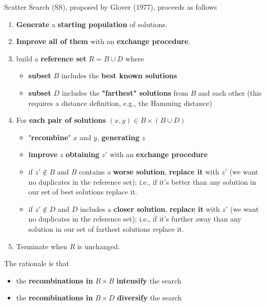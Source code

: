 Scatter Search (SS), proposed by Glover (1977), proceeds as follows
\begin{enumerate}
	\item \textbf{Generate} a \textbf{starting population} of solutions.\\
	
	\item \textbf{Improve all of them} with an \textbf{exchange procedure}.\\
	
	\item build a \textbf{reference set} $R = B \cup D$ where
	\begin{itemize}
		\item \textbf{subset} $B$ includes the \textbf{best known solutions}
		\item \textbf{subset} $D$ includes the \textbf{"farthest" solutions} from $B$ and each other (this requires a distance definition, e.g., the Hamming distance)
	\end{itemize}
	\nn
	
	\item For \textbf{each pair of solutions} $(x, y ) \in B \times (B \cup D)$
	\begin{itemize}
		\item "\textbf{recombine}" $x$ and $y$, \textbf{generating} $z$
		
		\item \textbf{improve} $z$ \textbf{obtaining} $z'$ with an \textbf{exchange procedure}
		
		\item if $z' \notin B$ and $B$ contains a \textbf{worse solution}, \textbf{replace it} with $z'$ (we want no duplicates in the reference set); i.e., if it's better than any solution in our set of best solutions replace it.
		
		\item if $z' \notin D$ and $D$ includes a \textbf{closer solution}, \textbf{replace it} with $z'$ (we want no duplicates in the reference set); i.e., if it's further away than any solution in our set of farthest solutions replace it.
	\end{itemize}
	\nn
	
	\item Terminate when $R$ is unchanged.\\
\end{enumerate}

The rationale is that
\begin{itemize}
	\item the \textbf{recombinations in} $B \times B$ \textbf{intensify} the search
	
	\item the \textbf{recombinations in} $B \times D$ \textbf{diversify} the search
\end{itemize}

